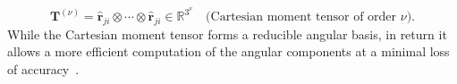 \begin{equation}
  \mathbf{T}^{(\nu)} = \hat{\mathbf{r}}_{ji} \otimes \cdots \otimes\hat{\mathbf{r}}_{ji}\in\mathbb{R}^{3^\nu}\quad \text{(Cartesian moment tensor of order $\nu$).}
\end{equation}
While the Cartesian moment tensor forms a reducible angular basis, in return it allows a more efficient computation of the angular components at a minimal loss of accuracy~\cite{zuo2020performance}.




